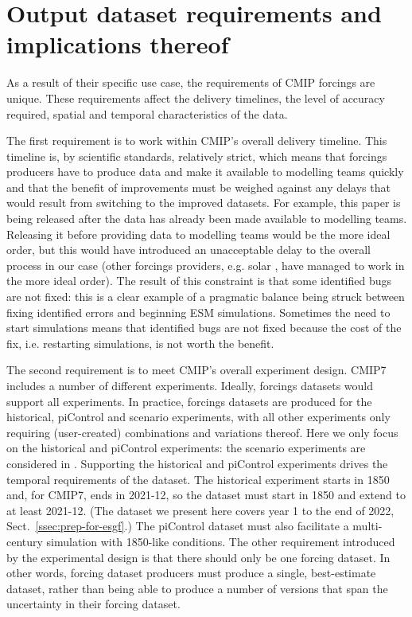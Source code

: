 \section{Output dataset requirements and implications thereof}
\label{sec:output-dataset-requirements}

As a result of their specific use case, the requirements of CMIP forcings are unique.
These requirements affect the delivery timelines, the level of accuracy required,
spatial and temporal characteristics of the data.

The first requirement is to work within CMIP's overall delivery timeline.
This timeline is, by scientific standards, relatively strict,
which means that forcings producers have to produce data and make it available to modelling teams quickly
and that the benefit of improvements must be weighed against any delays that would result from switching to the improved datasets.
For example, this paper is being released after the data has already been made available to modelling teams.
Releasing it before providing data to modelling teams would be the more ideal order,
but this would have introduced an unacceptable delay to the overall process in our case
(other forcings providers, e.g. solar \citep{funke_solar_2024},
have managed to work in the more ideal order).
The result of this constraint is that some identified bugs are not fixed:
this is a clear example of a pragmatic balance being struck
between fixing identified errors and beginning ESM simulations.
Sometimes the need to start simulations means that identified bugs are not fixed
because the cost of the fix, i.e. restarting simulations, is not worth the benefit.

The second requirement is to meet CMIP's overall experiment design.
CMIP7 includes a number of different experiments.
Ideally, forcings datasets would support all experiments.
In practice, forcings datasets are produced for the historical, piControl and scenario experiments,
with all other experiments only requiring (user-created) combinations and variations thereof.
Here we only focus on the historical and piControl experiments:
the scenario experiments are considered in \citet{nicholls_scenario-ghgs_2026}.
Supporting the historical and piControl experiments drives the temporal requirements of the dataset.
The historical experiment starts in 1850 and, for CMIP7, ends in 2021-12, so the dataset must start in 1850 and extend to at least 2021-12.
(The dataset we present here covers year 1 to the end of 2022, Sect.~\ref{ssec:prep-for-esgf}.)
The piControl dataset must also facilitate a multi-century simulation with 1850-like conditions.
The other requirement introduced by the experimental design is that there should only be one forcing dataset.
In other words, forcing dataset producers must produce a single, best-estimate dataset,
rather than being able to produce a number of versions that span the uncertainty in their forcing dataset.

